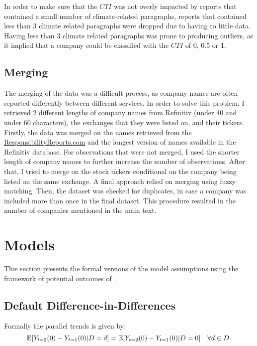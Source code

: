 \documentclass[12pt]{article}
\begin{document}
In order to make sure that the $CTI$ was not overly impacted by reports that contained a small number of climate-related paragraphs, reports that contained less than 3 climate related paragraphs were dropped due to having to little data. Having less than 3 climate related paragraphs was prone to producing outliers, as it implied that a company could be classified with the $CTI$ of 0, 0.5 or 1.

\subsection{Merging}\label{app:data:merging}

The merging of the data was a difficult process, as company names are often reported differently between different services. In order to solve this problem, I retrieved 2 different lengths of company names from Refinitiv (under 40 and under 60 characters), the exchanges that they were listed on, and their tickers. Firstly, the data was merged on the names retrieved from the \href{https://responsibilityreports.com}{ResponsibilityReports.com} and the longest version of names available in the Refinitiv database. For observations that were not merged, I used the shorter length of company names to further increase the number of observations. After that, I tried to merge on the stock tickers conditional on the company being listed on the same exchange. A final approach relied on merging using fuzzy matching. Then, the dataset was checked for duplicates, in case a company was included more than once in the final dataset. This procedure resulted in the number of companies mentioned in the main text.  

\section{Models}\label{app:models}

This section presents the formal versions of the model assumptions using the framework of potential outcomes of~\textcite{rubinEstimatingCausalEffects1974}.

\subsection{Default Difference-in-Differences}

Formally the parallel trends is given by: 
\begin{equation}
    \mathbb{E}[Y_{t=2}(0) - Y_{t=1}(0) | D = d] = \mathbb{E}[Y_{t=2}(0) - Y_{t=1}(0) | D = 0] \quad \forall \space d \in D.
\end{equation}
\end{document}
